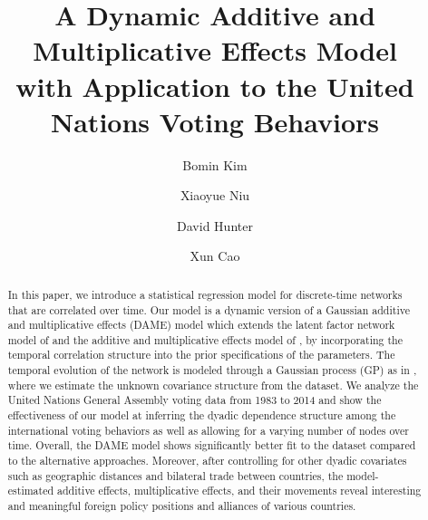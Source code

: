 \documentclass[a4paper]{article}
\title{A Dynamic Additive and Multiplicative Effects Model\\
	with Application to the United Nations Voting Behaviors}
\author[1]{Bomin Kim}
\author[1]{Xiaoyue Niu}
\author[1]{David Hunter}
\author[2]{Xun Cao}
\affil[1]{Department of Statistics, The Pennsylvania State University}
\affil[2]{Department of Political Science, The Pennsylvania State University}
\date{}
\begin{document}
	\maketitle
	\begin{abstract}
		\noindent  
		In this paper, we introduce a statistical regression model for discrete-time networks that are correlated over time. Our model is a dynamic version of a Gaussian additive and multiplicative effects (DAME) model which extends the latent factor network model of \cite{hoff2009multiplicative} and the additive and multiplicative effects model of \cite{minhas2016inferential}, by incorporating the temporal correlation structure into the prior specifications of the parameters. The temporal evolution of the network is modeled through a Gaussian process (GP) as in \cite{durante2013nonparametric}, where we estimate the unknown covariance structure from the dataset. We analyze the United Nations General Assembly voting data from 1983 to 2014 \citep{12379_2016} and show the effectiveness of our model at inferring the dyadic dependence structure among the international voting behaviors as well as allowing for a varying number of nodes over time. Overall, the DAME model shows significantly better fit to the dataset compared to the alternative approaches. Moreover, after controlling for other dyadic covariates such as geographic distances and bilateral trade between countries, the model-estimated additive effects, multiplicative effects, and their movements reveal interesting and meaningful foreign policy positions and alliances of various countries. 
	\end{abstract}
\end{document}
